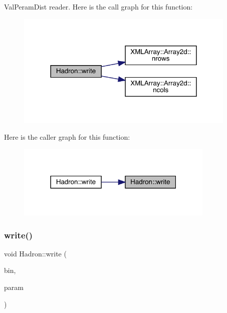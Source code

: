 Val\+Peram\+Dist reader. Here is the call graph for this function\+:\nopagebreak
\begin{figure}[H]
\begin{center}
\leavevmode
\includegraphics[width=298pt]{d1/daf/namespaceHadron_afebbe26d622d0f830042509739bee2da_cgraph}
\end{center}
\end{figure}
Here is the caller graph for this function\+:\nopagebreak
\begin{figure}[H]
\begin{center}
\leavevmode
\includegraphics[width=267pt]{d1/daf/namespaceHadron_afebbe26d622d0f830042509739bee2da_icgraph}
\end{center}
\end{figure}
\mbox{\label{namespaceHadron_a276bd4448f8f6233aa951856e912651e}} 
\subsubsection{\texorpdfstring{write()}{write()}\hspace{0.1cm}{\footnotesize\ttfamily [75/95]}}
{\footnotesize\ttfamily void Hadron\+::write (\begin{DoxyParamCaption}\item[{\mbox{\hyperlink{classADATIO_1_1BinaryWriter}{Binary\+Writer}} \&}]{bin,  }\item[{const \mbox{\hyperlink{structHadron_1_1ValGenPropElementalOperator__t}{Val\+Gen\+Prop\+Elemental\+Operator\+\_\+t}} \&}]{param }\end{DoxyParamCaption})}



